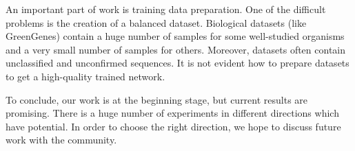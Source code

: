 \documentclass[a4paper,twoside]{article}
\begin{document}
An important part of work is training data preparation.
One of the difficult problems is the creation of a balanced dataset.
Biological datasets (like GreenGenes) contain a huge number of samples for some well-studied organisms and a very small number of samples for others.
Moreover, datasets often contain unclassified and unconfirmed sequences.
It is not evident how to prepare datasets to get a high-quality trained network.

To conclude, our work is at the beginning stage, but current results are promising. 
There is a huge number of experiments in different directions which have potential.
In order to choose the right direction, we hope to discuss future work with the community.





\vfill


{\small
}


\vfill
\end{document}
